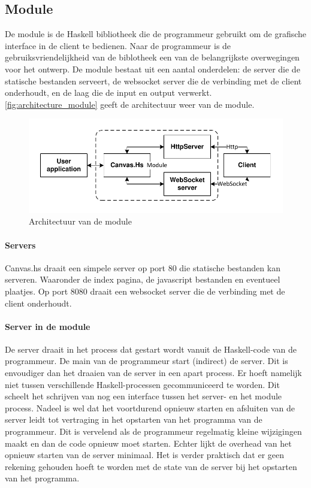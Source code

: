 \subsection{Module}
De module is de Haskell bibliotheek die de programmeur gebruikt om de grafische interface in de client te bedienen. Naar de programmeur is de gebruiksvriendelijkheid van de biblotheek een van de belangrijkste overwegingen voor het ontwerp. De module bestaat uit een aantal onderdelen: de server die de statische bestanden serveert, de websocket server die de verbinding met de client onderhoudt, en de laag die de input en output verwerkt. \autoref{fig:architecture_module} geeft de architectuur weer van de module.

\begin{figure}
\begin{center}
\includegraphics[keepaspectratio,width=\textwidth]{./images/module_architecture.pdf}
\caption{Architectuur van de module}
\label{fig:architecture_module}
\end{center}
\end{figure}

\paragraph{Servers}
Canvas.hs draait een simpele server op port 80 die statische bestanden kan serveren. Waaronder de index pagina, de javascript bestanden en eventueel plaatjes. Op port 8080 draait een websocket server die de verbinding met de client onderhoudt.


\paragraph{Server in de module}
De server draait in het process dat gestart wordt vanuit de Haskell-code van de programmeur. De main van de programmeur start (indirect) de server. Dit is envoudiger dan het draaien van de server in een apart process. Er hoeft namelijk niet tussen verschillende Haskell-processen gecommuniceerd te worden. Dit scheelt het schrijven van nog een interface tussen het server- en het module process. Nadeel is wel dat het voortdurend opnieuw starten en afsluiten van de server leidt tot vertraging in het opstarten van het programma van de programmeur. Dit is vervelend als de programmeur regelmatig kleine wijzigingen maakt en dan de code opnieuw moet starten. Echter lijkt de overhead van het opnieuw starten van de server minimaal. Het is verder praktisch dat er geen rekening gehouden hoeft te worden met de state van de server bij het opstarten van het programma.

